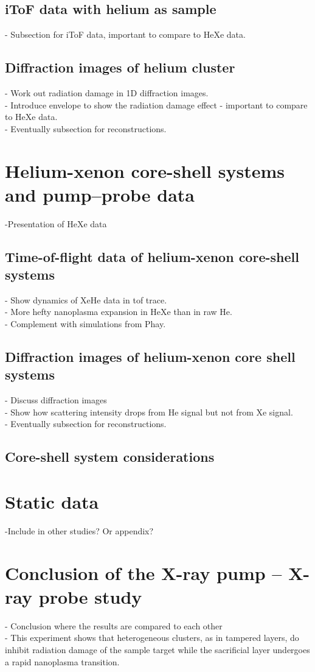 \subsection{iToF data with helium as sample}
- Subsection for iToF data, important to compare to HeXe data.
\subsection{Diffraction images of helium cluster}
- Work out radiation damage in 1D diffraction images.\\
- Introduce envelope to show the radiation damage effect - important to compare to HeXe data.\\
- Eventually subsection for reconstructions.
%
%
%
\section{Helium-xenon core-shell systems and pump--probe data}\label{sec:helium-xenon-data}
-Presentation of HeXe data
\subsection{Time-of-flight data of helium-xenon core-shell systems}
- Show dynamics of XeHe data in tof trace.\\
- More hefty nanoplasma expansion in HeXe than in raw He.\\
- Complement with simulations from Phay.
\subsection{Diffraction images of helium-xenon core shell systems}
- Discuss diffraction images\\
- Show how scattering intensity drops from He signal but not from Xe signal.\\
- Eventually subsection for reconstructions.
\subsection{Core-shell system considerations}
%
%
%
\section{Static data}\label{sec:static}
-Include in other studies? Or appendix?
%
%
%
\section{Conclusion of the X-ray pump -- X-ray probe study}
- Conclusion where the results are compared to each other\\
- This experiment shows that heterogeneous clusters, as in tampered layers, do inhibit radiation damage of the sample target while the sacrificial layer undergoes a rapid nanoplasma transition.